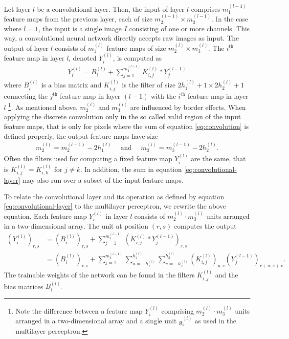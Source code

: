 Let layer $l$ be a convolutional layer. Then, the input of layer $l$ comprises $m_1^{(l-1)}$ feature maps from the previous layer, each of size $m_2^{(l-1)} \times m_3^{(l-1)}$. In the case where $l = 1$, the input is a single image $I$ consisting of one or more channels. This way, a convolutional neural network directly accepts raw images as input. The output of layer $l$ consists of $m_1^{(l)}$ feature maps of size $m_2^{(l)} \times m_3^{(l)}$. The $i^{\text{th}}$ feature map in layer $l$, denoted $Y_i^{(l)}$, is computed as
\begin{align}
	\label{eq:convolutional-layer}
	Y_i^{(l)} = B^{(l)}_{i} + \sum _{j = 1}^{m_1^{(l-1)}} K^{(l)}_{i,j} \ast Y_j^{(l-1)}
\end{align}
where $B_i^{(l)}$ is a bias matrix and $K^{(l)}_{i,j}$ is the filter of size $2h_1^{(l)} + 1 \times 2h_2^{(l)} + 1$ connecting the $j^{\text{th}}$ feature map in layer $(l-1)$ with the $i^{\text{th}}$ feature map in layer $l$ \cite{LeCunKavukvuogluFarabet:2010}\footnote{Note the difference between a feature map $Y_i^{(l)}$ comprising $m_2^{(l)} \cdot m_3^{(l)}$ units arranged in a two-dimensional array and a single unit $y_i^{(l)}$ as used in the multilayer perceptron.}. As mentioned above, $m_2^{(l)}$ and $m_3^{(l)}$ are influenced by border effects. When applying the discrete convolution only in the so called valid region of the input feature maps, that is only for pixels where the sum of equation \eqref{eq:convolution} is defined properly, the output feature maps have size
\begin{align}
	m_2^{(l)} = m_2^{(l-1)} - 2h_1^{(l)}\quad \text{ and }\quad m_3^{(l)} = m_3^{(l-1)} - 2h_2^{(l)}.
\end{align}
Often the filters used for computing a fixed feature map $Y_i^{(l)}$ are the same, that is $K_{i,j}^{(l)} = K _{i,k}^{(l)}$ for $j \neq k$. In addition, the sum in equation \eqref{eq:convolutional-layer} may also run over a subset of the input feature maps.

To relate the convolutional layer and its operation as defined by equation \eqref{eq:convolutional-layer} to the multilayer perceptron, we rewrite the above equation. Each feature map $Y_i^{(l)}$ in layer $l$ consists of $m_2^{(l)} \cdot m_3^{(l)}$ units arranged in a two-dimensional array. The unit at position $(r,s)$ computes the output
\begin{align}
	\left(Y_i^{(l)}\right)_{r,s} &= \left(B_i^{(l)}\right)_{r,s} + \sum _{j = 1}^{m_1^{(l-1)}} \left(K^{(l)}_{i,j} \ast Y_j^{(l-1)}\right)_{r,s}\\
	&= \left(B_i^{(l)}\right)_{r,s} + \sum _{j = 1}^{m_1^{(l-1)}} \sum _{u = - h_1^{(l)}} ^{h_1^{(l)}} \sum _{v = - h_2^{(l)}} ^{h_2^{(l)}} \left(K^{(l)}_{i,j}\right)_{u,v} \left(Y_j^{(l-1)}\right)_{r+u,s+v}.
\end{align}
The trainable weights of the network can be found in the filters $K^{(l)}_{i,j}$ and the bias matrices $B_i^{(l)}$.

